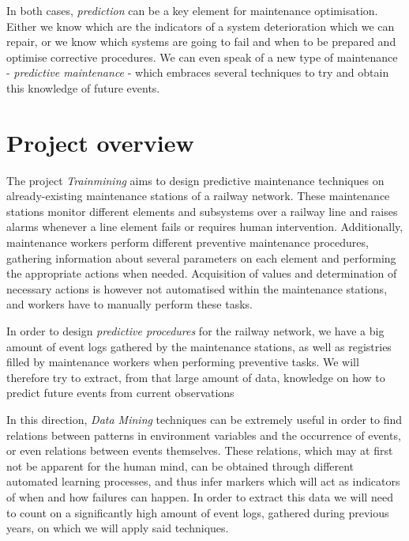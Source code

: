 In both cases, \emph{prediction} can be a key element for maintenance optimisation. Either we know which are the indicators of a system deterioration which we can repair, or we know which systems are going to fail and when to be prepared and optimise corrective procedures. We can even speak of a new type of maintenance - \emph{predictive maintenance} - which embraces several techniques to try and obtain this knowledge of future events.

\section{Project overview}
The project \emph{Trainmining} aims to design predictive maintenance techniques on already-existing maintenance stations of a railway network. These maintenance stations monitor different elements and subsystems over a railway line and raises alarms whenever a line element fails or requires human intervention. Additionally, maintenance workers perform different preventive maintenance procedures, gathering information about several parameters on each element and performing the appropriate actions when needed. Acquisition of values and determination of necessary actions is however not automatised within the maintenance stations, and workers have to manually perform these tasks.

In order to design \emph{predictive procedures} for the railway network, we have a big amount of event logs gathered by the maintenance stations, as well as registries filled by maintenance workers when performing preventive tasks. We will therefore try to extract, from that large amount of data, knowledge on how to predict future events from current observations

In this direction, \emph{Data Mining} techniques can be extremely useful in order to find relations between patterns in environment variables and the occurrence of events, or even relations between events themselves. These relations, which may at first not be apparent for the human mind, can be obtained through different automated learning processes, and thus infer markers which will act as indicators of when and how failures can happen. In order to extract this data we will need to count on a significantly high amount of event logs, gathered during previous years, on which we will apply said techniques.

